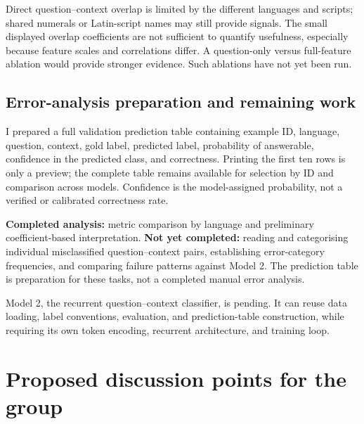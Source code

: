 \documentclass[11pt,a4paper]{article}
\begin{document}
Direct question--context overlap is limited by the different languages and scripts; shared numerals or Latin-script names may still provide signals. The small displayed overlap coefficients are not sufficient to quantify usefulness, especially because feature scales and correlations differ. A question-only versus full-feature ablation would provide stronger evidence. Such ablations have not yet been run.

\subsection{Error-analysis preparation and remaining work}
I prepared a full validation prediction table containing example ID, language, question, context, gold label, predicted label, probability of answerable, confidence in the predicted class, and correctness. Printing the first ten rows is only a preview; the complete table remains available for selection by ID and comparison across models. Confidence is the model-assigned probability, not a verified or calibrated correctness rate.

\textbf{Completed analysis:} metric comparison by language and preliminary coefficient-based interpretation. \textbf{Not yet completed:} reading and categorising individual misclassified question--context pairs, establishing error-category frequencies, and comparing failure patterns against Model 2. The prediction table is preparation for these tasks, not a completed manual error analysis.

Model 2, the recurrent question--context classifier, is pending. It can reuse data loading, label conventions, evaluation, and prediction-table construction, while requiring its own token encoding, recurrent architecture, and training loop.

\section{Proposed discussion points for the group}
\end{document}
